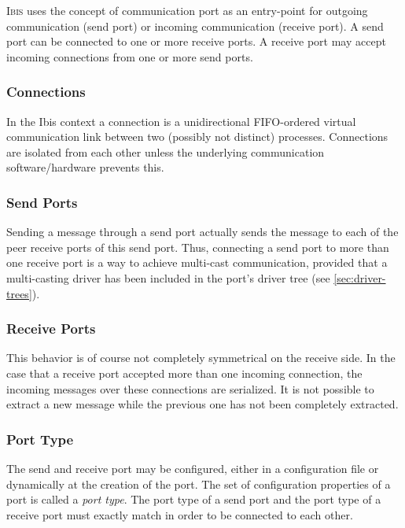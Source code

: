 \documentclass[11pt]{book}
\def\Ibis{\textsc{Ibis}\xspace}
\begin{document}
\Ibis uses the concept of communication port as an entry-point for
outgoing communication (send port) or incoming communication (receive
port). A send port can be connected to one or more receive ports. A
receive port may accept incoming connections from one or more send
ports.

%
\subsubsection{Connections}
\label{sec:connections}

In the Ibis context a connection is a unidirectional FIFO-ordered
virtual communication link between two (possibly not distinct)
processes. Connections are isolated from each other unless the
underlying communication software/hardware prevents this.


\subsubsection{Send Ports}
\label{sec:send-ports}

Sending a message through a send port actually sends the message to
each of the peer receive ports of this send port. Thus, connecting a
send port to more than one receive port is a way to achieve multi-cast
communication, provided that a multi-casting driver has been included
in the port's driver tree (see \ref{sec:driver-trees}).


\subsubsection{Receive Ports}
\label{sec:receive-ports}

This behavior is of course not completely symmetrical on the receive
side. In the case that a receive port accepted more than one incoming
connection, the incoming messages over these connections are
serialized. It is not possible to extract a new message while the
previous one has not been completely extracted.

\subsubsection{Port Type}
\label{sec:port-type}

The send and receive port may be configured, either in a configuration
file or dynamically at the creation of the port. The set of
configuration properties of a port is called a \textit{port type}. The
port type of a send port and the port type of a receive port must
exactly match in order to be connected to each other.
\end{document}
